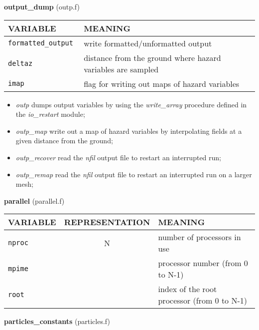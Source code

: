 %
{\large{\bf output\_dump}} (outp.f)\\[5mm]
\begin{tabular}{|p{6cm}|p{6cm}|}\hline
VARIABLE &  MEANING\\\hline
\tt  formatted\_output  & write formatted/unformatted output \\\hline
\tt  deltaz  & distance from the ground where hazard variables are sampled \\\hline
\tt  imap  & flag for writing out maps of hazard variables \\\hline
\end{tabular}
\begin{itemize}
\item{\em outp} dumps output variables by using the {\em write\_array} procedure defined in the {\em io\_restart}
 module;
\item{\em outp\_map} write out a map of hazard variables by interpolating fields at a given distance from the ground;
\item{\em outp\_recover} read the {\em nfil} output file to restart an interrupted run;
\item{\em outp\_remap} read the {\em nfil} output file to restart an interrupted run on a larger mesh;
\end{itemize}
%
%
{\large{\bf parallel}} (parallel.f)\\[5mm]
\begin{tabular}{|p{6cm}|c|p{6cm}|}\hline
VARIABLE & REPRESENTATION & MEANING\\\hline
\tt  nproc & N & number of processors in use\\\hline
\tt  mpime &  & processor number (from 0 to N-1) \\\hline
\tt  root  &  & index of the root processor (from 0 to N-1) \\\hline
\end{tabular}
%
%
{\large{\bf particles\_constants}} (particles.f)\\[5mm]
